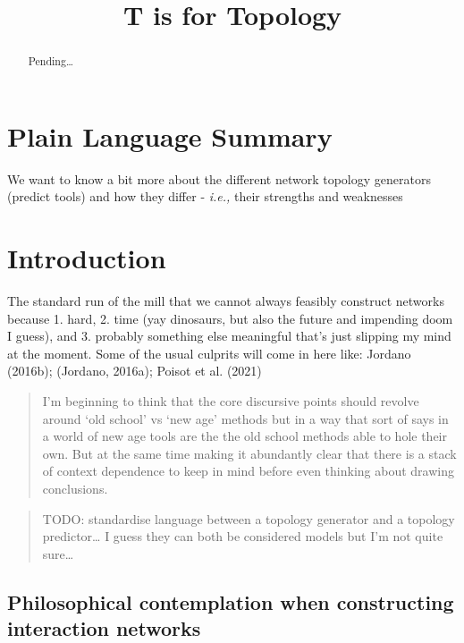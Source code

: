 \documentclass[
]{agujournal2019}
\begin{document}
\title{T is for Topology}



\begin{abstract}
Pending\ldots{}
\end{abstract}

\section*{Plain Language Summary}
We want to know a bit more about the different network topology
generators (predict tools) and how they differ - \emph{i.e.,} their
strengths and weaknesses



\section{Introduction}\label{introduction}

The standard run of the mill that we cannot always feasibly construct
networks because 1. hard, 2. time (yay dinosaurs, but also the future
and impending doom I guess), and 3. probably something else meaningful
that's just slipping my mind at the moment. Some of the usual culprits
will come in here like: Jordano (2016b); (Jordano, 2016a); Poisot et al.
(2021)

\begin{quote}
I'm beginning to think that the core discursive points should revolve
around `old school' vs `new age' methods but in a way that sort of says
in a world of new age tools are the the old school methods able to hole
their own. But at the same time making it abundantly clear that there is
a stack of context dependence to keep in mind before even thinking about
drawing conclusions.
\end{quote}

\begin{quote}
TODO: standardise language between a topology generator and a topology
predictor\ldots{} I guess they can both be considered models but I'm not
quite sure\ldots{}
\end{quote}

\subsection{Philosophical contemplation when constructing interaction
networks}\label{philosophical-contemplation-when-constructing-interaction-networks}
\end{document}
